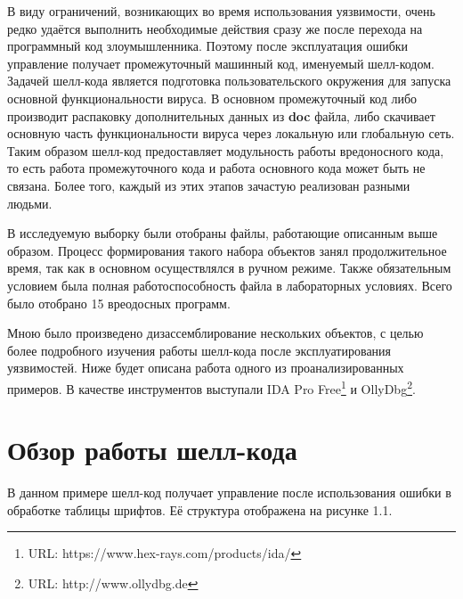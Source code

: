 В виду ограничений, возникающих во время использования уязвимости, очень редко удаётся выполнить необходимые действия сразу же после перехода на программный код злоумышленника.
Поэтому после эксплуатация ошибки управление получает промежуточный машинный код, именуемый шелл-кодом.
Задачей шелл-кода является подготовка пользовательского окружения для запуска основной функциональности вируса.
В основном промежуточный код либо производит распаковку дополнительных данных из \textbf{doc} файла, либо скачивает основную часть функциональности вируса через локальную или глобальную сеть.
Таким образом шелл-код предоставляет модульность работы вредоносного кода, то есть работа промежуточного кода и работа основного кода может быть не связана.
Более того, каждый из этих этапов зачастую реализован разными людьми.

В исследуемую выборку были отобраны файлы, работающие описанным выше образом.
Процесс формирования такого набора объектов занял продолжительное время, так как в основном осуществлялся в ручном режиме.
Также обязательным условием была полная работоспособность файла в лабораторных условиях.
Всего было отобрано 15 вреодосных программ.

Мною было произведено дизассемблирование нескольких объектов, с целью более подробного изучения работы шелл-кода после эксплуатирования уязвимостей.
Ниже будет описана работа одного из проанализированных примеров.
В качестве инструментов выступали IDA Pro Free\footnote{URL: https://www.hex-rays.com/products/ida/} и OllyDbg\footnote{URL: http://www.ollydbg.de}.

\newpage
\section{Обзор работы шелл-кода}

В данном примере шелл-код получает управление после использования ошибки в обработке таблицы шрифтов.
Её структура отображена на рисунке 1.1. 

